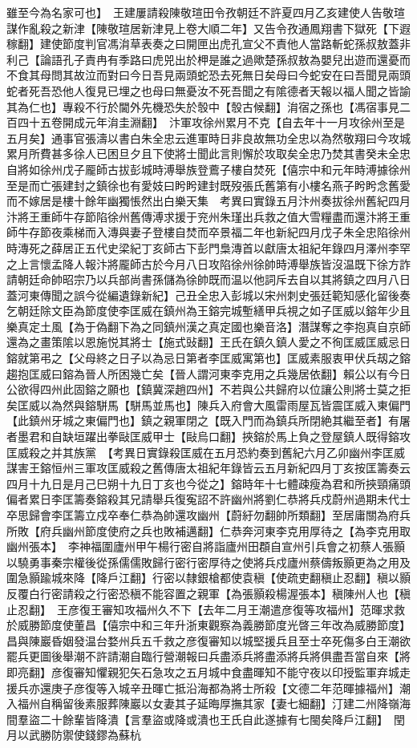 雖至今為名家可也】　王建屢請殺陳敬瑄田令孜朝廷不許夏四月乙亥建使人告敬瑄謀作亂殺之新津【陳敬瑄居新津見上卷大順二年】又告令孜通鳳翔書下獄死【下遐稼翻】建使節度判官馮㳙草表奏之曰開匣出虎孔宣父不責他人當路斬蛇孫叔敖蓋非利己【論語孔子責冉有季路曰虎兕出於柙是誰之過歟楚孫叔敖為嬰兒出遊而還憂而不食其母問其故泣而對曰今日吾見兩頭蛇恐去死無日矣母曰今蛇安在曰吾聞見兩頭蛇者死吾恐他人復見已埋之也母曰無憂汝不死吾聞之有隂德者天報以福人聞之皆諭其為仁也】專殺不行於閫外先機恐失於彀中【彀古候翻】㳙宿之孫也【馮宿事見二百四十五卷開成元年㳙圭淵翻】　汴軍攻徐州累月不克【自去年十一月攻徐州至是五月矣】通事官張濤以書白朱全忠云進軍時日非良故無功全忠以為然敬翔曰今攻城累月所費甚多徐人已困旦夕且下使將士聞此言則懈於攻取矣全忠乃焚其書癸未全忠自將如徐州戊子龎師古拔彭城時溥舉族登鷰子樓自焚死【僖宗中和元年時溥據徐州至是而亡張建封之鎮徐也有愛妓曰盻盻建封既歿張氏舊第有小樓名燕子盻盻念舊愛而不嫁居是樓十餘年幽獨悵然出白樂天集　考異曰實錄五月汴州奏拔徐州舊紀四月汴將王重師牛存節陷徐州舊傳溥求援于兖州朱瑾出兵救之值大雪糧盡而還汴將王重師牛存節夜乘梯而入漙與妻子登樓自焚而卒景福二年也新紀四月戊子朱全忠陷徐州時漙死之薛居正五代史梁紀丁亥師古下彭門梟漙首以獻唐太祖紀年錄四月澤州李罕之上言懷孟降人報汴將龎師古於今月八日攻陷徐州徐帥時溥舉族皆沒温既下徐方詐請朝廷命帥昭宗乃以兵部尚書孫儲為徐帥既而温以他詞斥去自以其將鎮之四月八日蓋河東傳聞之誤今從編遺錄新紀】己丑全忠入彭城以宋州刺史張廷範知感化留後奏乞朝廷除文臣為節度使李匡威在鎮州為王鎔完城塹繕甲兵視之如子匡威以鎔年少且樂真定土風【為于偽翻下為之同鎮州漢之真定國也樂音洛】潛謀奪之李抱真自京師還為之畫策隂以恩施悦其將士【施式䜴翻】王氏在鎮久鎮人愛之不徇匡威匡威忌日鎔就第弔之【父母終之日子以為忌日第者李匡威寓第也】匡威素服衷甲伏兵刼之鎔趨抱匡威曰鎔為晉人所困幾亡矣【晉人謂河東李克用之兵幾居依翻】賴公以有今日公欲得四州此固鎔之願也【鎮冀深趙四州】不若與公共歸府以位讓公則將士莫之拒矣匡威以為然與鎔駢馬【駢馬並馬也】陳兵入府會大風雷雨屋瓦皆震匡威入東偏門【此鎮州牙城之東偏門也】鎮之親軍閉之【既入門而為鎮兵所閉絶其繼至者】有屠者墨君和自缺垣躍出拳敺匡威甲士【敺烏口翻】挾鎔於馬上負之登屋鎮人既得鎔攻匡威殺之并其族黨　【考異日實錄殺匡威在五月恐約奏到舊紀六月乙卯幽州李匡威謀害王鎔恒州三軍攻匡威殺之舊傳唐太祖紀年錄皆云五月新紀四月丁亥按匡籌奏云四月十九日是月己巳朔十九日丁亥也今從之】鎔時年十七體疎瘦為君和所挾頸痛頭偏者累日李匡籌奏鎔殺其兄請舉兵復寃詔不許幽州將劉仁恭將兵戍蔚州過期未代士卒思歸會李匡籌立戍卒奉仁恭為帥還攻幽州【蔚紆勿翻帥所類翻】至居庸關為府兵所敗【府兵幽州節度使府之兵也敗補邁翻】仁恭奔河東李克用厚待之【為李克用取幽州張本】　李神福圍廬州甲午楊行密自將詣廬州田頵自宣州引兵會之初蔡人張顥以驍勇事秦宗權後從孫儒儒敗歸行密行密厚待之使將兵戍廬州蔡儔叛顥更為之用及圍急顥踰城來降【降戶江翻】行密以隸銀槍都使袁稹【使疏吏翻稹止忍翻】稹以顥反覆白行密請殺之行密恐稹不能容置之親軍【為張顥殺楊渥張本】稹陳州人也【稹止忍翻】　王彦復王審知攻福州久不下【去年二月王潮遣彦復等攻福州】范暉求救於威勝節度使董昌【僖宗中和三年升浙東觀察為義勝節度光晵三年改為威勝節度】昌與陳巖昏姻發温台婺州兵五千救之彦復審知以城堅援兵且至士卒死傷多白王潮欲罷兵更圖後舉潮不許請潮自臨行營潮報曰兵盡添兵將盡添將兵將俱盡吾當自來【將即亮翻】彦復審知懼親犯矢石急攻之五月城中食盡暉知不能守夜以印授監軍弃城走援兵亦還庚子彦復等入城辛丑暉亡抵沿海都為將士所殺【文德二年范暉據福州】潮入福州自稱留後素服葬陳巖以女妻其子延晦厚撫其家【妻七細翻】汀建二州降嶺海間羣盜二十餘輩皆降潰【言羣盜或降或潰也王氏自此遂據有七閩矣降戶江翻】　閏月以武勝防禦使錢鏐為蘇杭